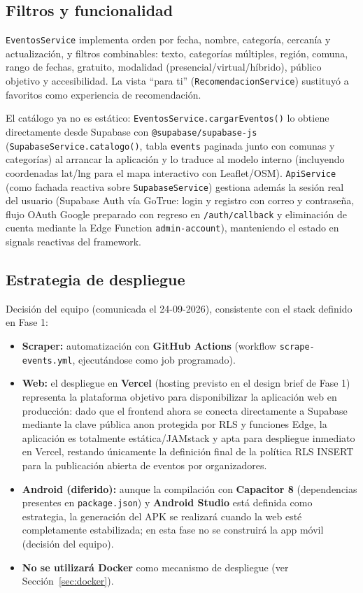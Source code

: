 \subsection{Filtros y funcionalidad}

\texttt{EventosService} implementa orden por fecha, nombre, categoría, cercanía y
actualización, y filtros combinables: texto, categorías múltiples, región, comuna, rango de
fechas, gratuito, modalidad (presencial/virtual/híbrido), público objetivo y accesibilidad.
La vista ``para ti'' (\texttt{RecomendacionService}) sustituyó a favoritos como experiencia
de recomendación.

El catálogo ya no es estático: \texttt{EventosService.cargarEventos()} lo obtiene directamente
desde Supabase con \texttt{@supabase/supabase-js} (\texttt{SupabaseService.catalogo()}, tabla \texttt{events}
paginada junto con comunas y categorías) al arrancar la aplicación y lo traduce al modelo interno
(incluyendo coordenadas lat/lng para el mapa interactivo con Leaflet/OSM). \texttt{ApiService} (como fachada
reactiva sobre \texttt{SupabaseService}) gestiona además la sesión real del usuario (Supabase Auth vía GoTrue:
login y registro con correo y contraseña, flujo OAuth Google preparado con regreso en \texttt{/auth/callback}
y eliminación de cuenta mediante la Edge Function \texttt{admin-account}), manteniendo el estado en signals
reactivas del framework.

\subsection{Estrategia de despliegue}

Decisión del equipo (comunicada el 24-09-2026), consistente con el stack definido en Fase 1:

\begin{itemize}[leftmargin=1.4em]
    \item \textbf{Scraper:} automatización con \textbf{GitHub Actions} (workflow
    \texttt{scrape-events.yml}, ejecutándose como job programado).
    \item \textbf{Web:} el despliegue en \textbf{Vercel}
    (hosting previsto en el design brief de Fase 1) representa la plataforma objetivo
    para disponibilizar la aplicación web en producción: dado que el frontend ahora
    se conecta directamente a Supabase mediante la clave pública anon protegida por RLS
    y funciones Edge, la aplicación es totalmente estática/JAMstack y apta para despliegue
    inmediato en Vercel, restando únicamente la definición final de la política RLS INSERT
    para la publicación abierta de eventos por organizadores.
    \item \textbf{Android (diferido):} aunque la compilación con \textbf{Capacitor 8}
    (dependencias presentes en \texttt{package.json}) y \textbf{Android Studio} está
    definida como estrategia, la generación del APK se realizará cuando la web esté
    completamente estabilizada; en esta fase no se construirá la app móvil
    (decisión del equipo).
    \item \textbf{No se utilizará Docker} como mecanismo de despliegue
    (ver Sección~\ref{sec:docker}).
\end{itemize}

